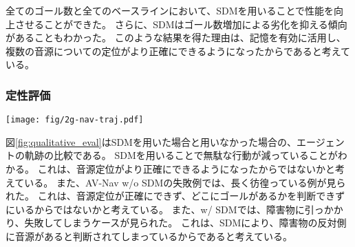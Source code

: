 全てのゴール数と全てのベースラインにおいて、SDMを用いることで性能を向上させることができた。
さらに、SDMはゴール数増加による劣化を抑える傾向があることもわかった。
このような結果を得た理由は、記憶を有効に活用し、複数の音源についての定位がより正確にできるようになったからであると考えている。

\subsubsection{定性評価}

\begin{figure*}[t]
    \begin{center}
        \centering
        \texttt{[image: fig/2g-nav-traj.pdf]}
        \caption{
            ナビゲーションの軌跡比較。
            上段がAV-Nav w/o SDMで、下段がAV-Nav w/ SDMである。
            また、Pathの色はステップの経過を表している。
            ステップが経過するにつれ、青から赤へ変化する。
        }
        \label{fig:qualitative_eval}
    \end{center}
\end{figure*}


図\ref{fig:qualitative_eval}はSDMを用いた場合と用いなかった場合の、エージェントの軌跡の比較である。
SDMを用いることで無駄な行動が減っていることがわかる。
これは、音源定位がより正確にできるようになったからではないかと考えている。
また、AV-Nav w/o SDMの失敗例では、長く彷徨っている例が見られた。
これは、音源定位が正確にできず、どこにゴールがあるかを判断できずにいるからではないかと考えている。
また、w/ SDMでは、障害物に引っかかり、失敗してしまうケースが見られた。
これは、SDMにより、障害物の反対側に音源があると判断されてしまっているからであると考えている。

